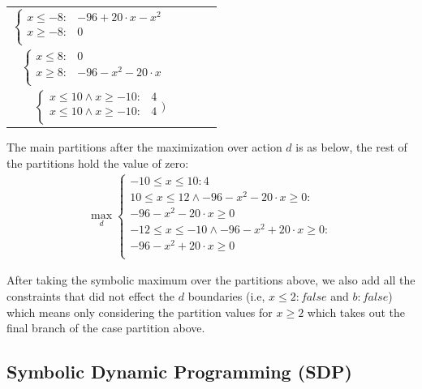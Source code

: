 \documentclass[letterpaper]{article}
\begin{document}
{\footnotesize
\begin{center}
\begin{tabular} {r c c c l}
\hspace{-4mm}
$
\begin{cases}
x \leq -8 : & -96 + 20 \cdot x - x^2 \\ 
x \geq -8 : & 0 \\ 
\end{cases} $

\\
\hspace{-4mm}
$ \begin{cases}
x \leq 8 : & 0 \\ 
x \geq 8: & -96 -x^2 -20\cdot x\\
\end{cases}$
\hspace{-4mm} 
\\
\hspace{-4mm}
$\begin{cases}
x \leq 10 \wedge x \geq -10 : & 4 \\ 
x \leq 10 \wedge x \geq -10 : & 4 \\ 
\end{cases})$
\end{tabular}
\end{center}
}

The main partitions after the maximization over action $d$ is as below, the rest of the partitions hold the value of zero: 
\begin{align*}
\max_{d}
\begin{cases}
-10 \leq x \leq 10 : 4 \\ 
10 \leq x \leq 12  \wedge  -96-x^2-20\cdot x \geq 0: \\ -96-x^2-20\cdot x \geq 0 \\ 
-12 \leq x \leq -10  \wedge  -96-x^2+20\cdot x \geq 0:\\ -96-x^2+20\cdot x \geq 0 \\
  \end{cases}
\end{align*}

After taking the symbolic maximum over the partitions above, we also add all the constraints that did not effect the $d$ boundaries (i.e, $x\leq 2:false $ and $b:false$) which means only considering the partition values for $x \geq 2$ which takes out the final branch of the case partition above. 


\subsection{Symbolic Dynamic Programming (SDP)}
\end{document}
